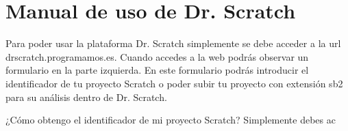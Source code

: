 \documentclass[a4paper, 12pt]{book}
\begin{document}

\cleardoublepage
\appendix

\chapter{Manual de uso de Dr. Scratch}
Para poder usar la plataforma Dr. Scratch simplemente se debe acceder a la url
drscratch.programamos.es.
Cuando accedes a la web podrás observar un formulario en la parte izquierda. En
este formulario podrás introducir el identificador de tu proyecto Scratch o poder
subir tu proyecto con extensión sb2 para su análisis dentro de Dr. Scratch.

¿Cómo obtengo el identificador de mi proyecto Scratch?
Simplemente debes ac


\cleardoublepage


\end{document}
